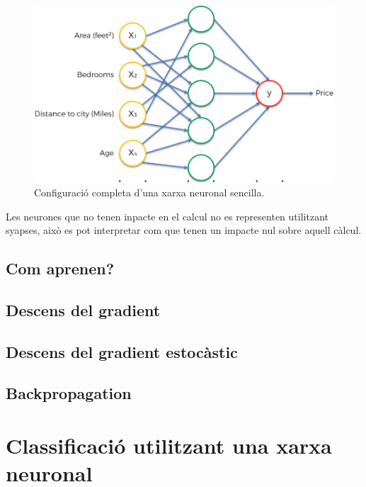 \documentclass[12pt]{article}
\begin{document}
\pagebreak
\clearpage
\begin{figure}[h!]
	\centering
	\includegraphics[scale=0.3]{imatges/funcionament/2completa.png}
	\caption{Configuració completa d'una xarxa neuronal sencilla.}
\end{figure}
Les neurones que no tenen inpacte en el calcul no es representen utilitzant syapses, això es pot interpretar com que tenen un impacte nul sobre aquell càlcul.

\clearpage
\subsection{Com aprenen?}


\clearpage
\subsection{Descens del gradient\label{dg}}


\clearpage
\subsection{Descens del gradient estocàstic\label{dge}}


\clearpage
\subsection{Backpropagation\label{bp}}


\clearpage
\section{Classificació utilitzant una xarxa neuronal}
\end{document}
